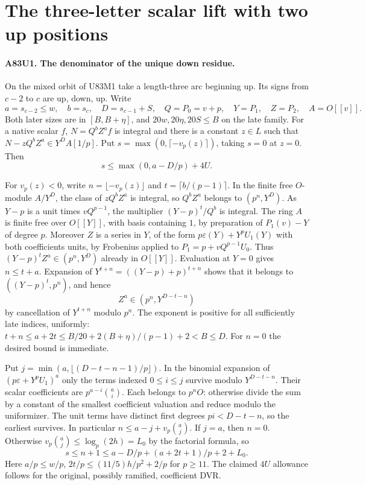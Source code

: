 \section{The three-letter scalar lift with two up positions}

\paragraph{A83U1. The denominator of the unique down residue.}
On the mixed orbit of U83M1 take a length-three arc beginning up.
Its signs from $c-2$ to $c$ are up, down, up. Write
\[
 a=s_{c-2}\le w,\quad b=s_c,\quad D=s_{c-1}+S,\quad
 Q=P_0=v+p,\quad Y=P_1,\quad Z=P_2,\quad A=O[[v]].
\]
Both later sizes are in $[B,B+\eta]$, and
$20w,20\eta,20S\le B$ on the late family. For a native scalar
$f$, $N=Q^bZ^a f$ is integral and there is a constant $z\in L$
such that $N-zQ^b Z^a\in Y^D A[1/p]$. Put
$s=\max(0,\lceil-v_p(z)\rceil)$, taking $s=0$ at $z=0$.
Then
\[
                  s\le \max(0,a-D/p)+4U .
\]

For $v_p(z)<0$, write $n=\lfloor-v_p(z)\rfloor$ and
$t=\lceil b/(p-1)\rceil$. In the finite free $O$-module
$A/Y^D$, the class of $z Q^b Z^a$ is integral, so $Q^b Z^a$
belongs to $(p^n,Y^D)$. As $Y-p$ is a unit times $vQ^{p-1}$,
the multiplier $(Y-p)^t/Q^b$ is integral. The ring $A$ is
finite free over $O[[Y]]$, with basis containing $1$, by
preparation of $P_1(v)-Y$ of degree $p$. Moreover $Z$ is a
series in $Y$, of the form $p\varepsilon(Y)+Y^p U_1(Y)$ with
both coefficients units, by Frobenius applied to
$P_1=p+vQ^{p-1}U_0$. Thus
$(Y-p)^t Z^a\in(p^n,Y^D)$ already in $O[[Y]]$.
Evaluation at $Y=0$ gives $n\le t+a$. Expansion of
$Y^{t+n}=((Y-p)+p)^{t+n}$ shows that it belongs to
$((Y-p)^t,p^n)$, and hence
\[
              Z^a\in(p^n,Y^{D-t-n})
\]
by cancellation of $Y^{t+n}$ modulo $p^n$. The exponent is
positive for all sufficiently late indices, uniformly:
$t+n\le a+2t\le B/20+2(B+\eta)/(p-1)+2<B\le D$.
For $n=0$ the desired bound is immediate.

Put $j=\min(a,\lfloor(D-t-n-1)/p\rfloor)$. In the binomial
expansion of $(p\varepsilon+Y^p U_1)^a$ only the terms indexed
$0\le i\le j$ survive modulo $Y^{D-t-n}$. Their scalar
coefficients are $p^{a-i}\binom ai$. Each belongs to $p^nO$:
otherwise divide the sum by a constant of the smallest coefficient
valuation and reduce modulo the uniformizer. The unit terms have
distinct first degrees $pi<D-t-n$, so the earliest survives.
In particular
$n\le a-j+v_p\binom aj$. If $j=a$, then $n=0$. Otherwise
$v_p\binom aj\le\log_p(2h)=L_0$ by the factorial formula, so
\[
 s\le n+1\le a-D/p+(a+2t+1)/p+2+L_0 .
\]
Here $a/p\le w/p$, $2t/p\le(11/5)h/p^2+2/p$ for $p\ge11$.
The claimed $4U$ allowance follows for the original, possibly
ramified, coefficient DVR.

